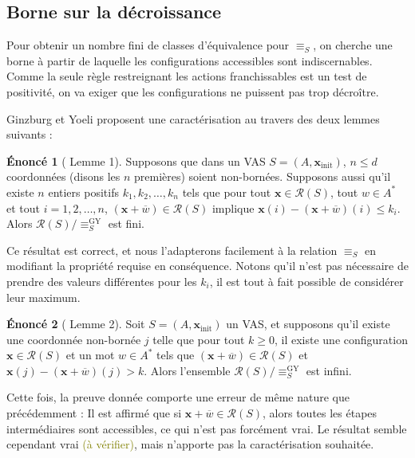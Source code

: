 \documentclass[a4paper,final]{article}
\theoremstyle{definition}
\newtheorem*{Statement}{Énoncé}
\let\leq\leqslant
\let\geq\geqslant
\newcommand{\lucas}[1]{\textcolor{olive}{#1}}
\newcommand{\lang}{\ensuremath{\mathcal{L}}}
\newcommand{\reach}{\ensuremath{\mathcal{R}}}
\newcommand{\vect}[1]{\ensuremath{\mathbf{#1}}}
\newcommand{\rel}{\ensuremath{\equiv}}
\newcommand{\relGY}{\ensuremath{\equiv^\text{GY}_S}}
\newcommand{\xinit}{\ensuremath{\vect{x}_\text{init}}}
\newcommand{\valeur}[1]{\ensuremath{\overline{#1}}}
\begin{document}

\subsection{Borne sur la décroissance}

Pour obtenir un nombre fini de classes d'équivalence pour $\rel_S$, on cherche une borne à partir de laquelle les configurations accessibles sont indiscernables.
Comme la seule règle restreignant les actions franchissables est un test de positivité, on va exiger que les configurations ne puissent pas trop décroître.

Ginzburg et Yoeli proposent une caractérisation au travers des deux lemmes suivants :


\begin{Statement}[\cite{giyo80} Lemme 1]
    Supposons que dans un VAS $S=(A,\xinit)$, $n\leq d$ coordonnées (disons les $n$ premières) soient non-bornées.
    Supposons aussi qu'il existe $n$ entiers positifs $k_1,k_2,\dots,k_n$ tels que pour tout $\vect{x}\in\reach(S)$, tout $w\in A^\ast$ et tout $i=1,2,\dots,n$, 
    $(\vect{x} +\valeur{w})\in\reach(S)$ implique
    $\vect{x}(i) - (\vect{x} +\valeur{w})(i) \leq k_i$.
    Alors $\reach(S)/\relGY$ est fini.
\end{Statement}

Ce résultat est correct, et nous l'adapterons facilement à la relation $\rel_S$ en modifiant la propriété requise en conséquence.
Notons qu'il n'est pas nécessaire de prendre des valeurs différentes pour les $k_i$, il est tout à fait possible de considérer leur maximum.

\begin{Statement}[\cite{giyo80} Lemme 2]
    Soit $S=(A,\xinit)$ un VAS, et supposons qu'il existe une coordonnée non-bornée $j$ telle que 
    pour tout $k\geq 0$, il existe une configuration $\vect{x}\in\reach(S)$ et un mot $w\in A^\ast$ tels que 
    $(\vect{x} +\valeur{w}) \in\reach(S)$ et $\vect{x}(j) - (\vect{x} +\valeur{w})(j) > k$.
    Alors l'ensemble $\reach(S)/\relGY$ est infini.
\end{Statement}

Cette fois, la preuve donnée comporte une erreur de même nature que précédemment :
Il est affirmé que si $\vect{x} +\valeur{w} \in\reach(S)$, alors toutes les étapes intermédiaires sont accessibles, ce qui n'est pas forcément vrai.
Le résultat semble cependant vrai \lucas{(à vérifier)}, mais n'apporte pas la caractérisation souhaitée.
\end{document}
